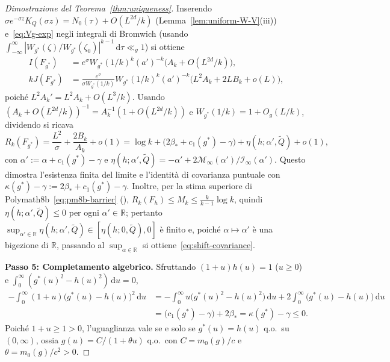 \documentclass[11pt, reqno]{amsart}
\theoremstyle{remark}
\numberwithin{equation}{section}
\newcommand{\R}{\mathbb{R}}
\newcommand{\dd}{\,\mathrm{d}}
\begin{document}
\begin{proof}[Dimostrazione del Teorema~\ref{thm:uniqueness}]
Inserendo $\sigma e^{-\sigma z} K_Q(\sigma z) = N_0(\tau) + O(L^{2d}/k)$ (Lemma~\ref{lem:uniform-W-V}(iii))
e~\eqref{eq:Vg-exp} negli integrali di Bromwich (usando $\int_{-\infty}^\infty |W_{g^*}(\zeta)/W_{g^*}(\zeta_0)|^{k-1}\dd\tau \ll_g 1$)
si ottiene
\begin{align*}
I(F_{g^*}) &= e^\sigma W_{g^*}(1/k)^k (a')^{-k} \bigl(A_k + O(L^{2d}/k)\bigr), \\
k J(F_{g^*}) &= \frac{e^\sigma}{\sigma W_{g^*}(1/k)} W_{g^*}(1/k)^k (a')^{-k} \bigl(L^2 A_k + 2L B_k + o(L)\bigr),
\end{align*}
poiché $L^2 A_k' = L^2 A_k + O(L^3/k)$. Usando $(A_k + O(L^{2d}/k))^{-1} = A_k^{-1}(1 + O(L^{2d}/k))$ e
$W_{g^*}(1/k) = 1 + O_g(L/k)$, dividendo si ricava
\[
R_k(F_{g^*}) = \frac{L^2}{\sigma} + \frac{2 B_k}{A_k} + o(1)
= \log k + \bigl(2\beta_* + c_1(g^*) - \gamma\bigr) + \eta(h; \alpha', \widetilde{Q}) + o(1),
\]
con $\alpha' := \alpha + c_1(g^*) - \gamma$ e $\eta(h; \alpha', \widetilde{Q}) = -\alpha' + 2\mathcal{M}_\infty(\alpha')/\mathcal{I}_\infty(\alpha')$.
Questo dimostra l'esistenza finita del limite e l'identità di covarianza puntuale con
$\kappa(g^*) - \gamma := 2\beta_* + c_1(g^*) - \gamma$. Inoltre, per la stima superiore di
Polymath8b~\eqref{eq:pm8b-barrier} (\cite[Corollario~37]{PM8b}), $R_k(F_h) \le M_k \le \frac{k}{k-1}\log k$,
quindi $\eta(h; \alpha', \widetilde{Q}) \le 0$ per ogni $\alpha' \in \R$; pertanto
$\sup_{\alpha' \in \R} \eta(h; \alpha', \widetilde{Q}) \in [\eta(h; 0, \widetilde{Q}), 0]$ è finito e,
poiché $\alpha \mapsto \alpha'$ è una bigezione di $\R$, passando al $\sup_{\alpha \in \R}$ si
ottiene~\eqref{eq:shift-covariance}.

\smallskip
\noindent\textbf{Passo 5: Completamento algebrico.}
Sfruttando $(1+u)h(u) = 1$ ($u \ge 0$) e $\int_0^\infty (g^*(u)^2 - h(u)^2)\dd u = 0$,
\begin{align*}
-\int_0^\infty (1+u)\bigl(g^*(u) - h(u)\bigr)^2 \dd u
&= -\int_0^\infty u\bigl(g^*(u)^2 - h(u)^2\bigr)\dd u + 2\int_0^\infty \bigl(g^*(u) - h(u)\bigr)\dd u \\
&= \bigl(c_1(g^*) - \gamma\bigr) + 2\beta_* = \kappa(g^*) - \gamma \le 0.
\end{align*}
Poiché $1+u \ge 1 > 0$, l'uguaglianza vale se e solo se $g^*(u) = h(u)$ q.o.\ su $(0,\infty)$,
ossia $g(u) = C/(1+\theta u)$ q.o.\ con $C = m_0(g)/c$ e $\theta = m_0(g)/c^2 > 0$.
\end{proof}
\end{document}
